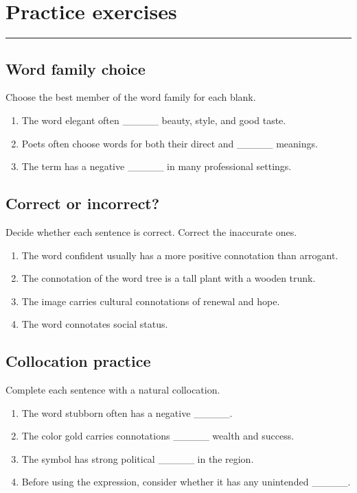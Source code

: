 \documentclass[11pt]{article}
\newcommand{\sectionrule}{\par\vspace{-0.5em}\noindent\textcolor{Accent}{\rule{\linewidth}{0.6pt}}\par}
\begin{document}
\section{Practice exercises}
\sectionrule
\subsection{Word family choice}
Choose the best member of the word family for each blank.

\begin{enumerate}
  \item The word elegant often \_\_\_\_\_ beauty, style, and good taste.
  \item Poets often choose words for both their direct and \_\_\_\_\_ meanings.
  \item The term has a negative \_\_\_\_\_ in many professional settings.
\end{enumerate}

\subsection{Correct or incorrect?}
Decide whether each sentence is correct. Correct the inaccurate ones.

\begin{enumerate}
  \item The word confident usually has a more positive connotation than arrogant.
  \item The connotation of the word tree is a tall plant with a wooden trunk.
  \item The image carries cultural connotations of renewal and hope.
  \item The word connotates social status.
\end{enumerate}

\subsection{Collocation practice}
Complete each sentence with a natural collocation.

\begin{enumerate}
  \item The word stubborn often has a negative \_\_\_\_\_.
  \item The color gold carries connotations \_\_\_\_\_ wealth and success.
  \item The symbol has strong political \_\_\_\_\_ in the region.
  \item Before using the expression, consider whether it has any unintended \_\_\_\_\_.
\end{enumerate}
\end{document}
